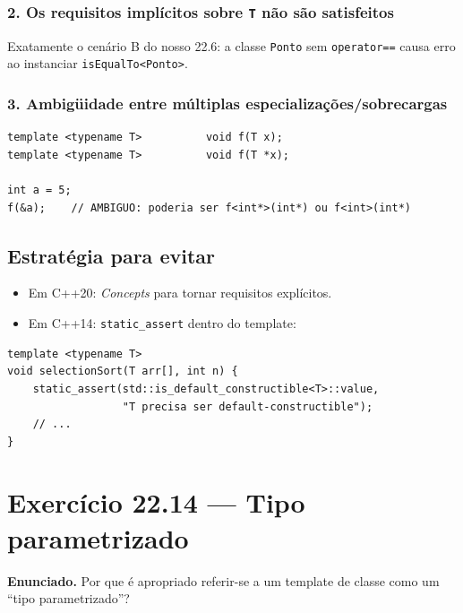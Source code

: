 \documentclass[11pt,a4paper]{article}
\begin{document}
\subsubsection*{2. Os requisitos impl\'icitos sobre \texttt{T} n\~ao s\~ao satisfeitos}

Exatamente o cen\'ario B do nosso 22.6: a classe \texttt{Ponto} sem \texttt{operator==} causa erro ao instanciar \texttt{isEqualTo<Ponto>}.

\subsubsection*{3. Ambig\"{u}idade entre m\'ultiplas especializa\c{c}\~oes/sobrecargas}

\begin{lstlisting}[style=cppcode,numbers=none]
template <typename T>          void f(T x);
template <typename T>          void f(T *x);

int a = 5;
f(&a);    // AMBIGUO: poderia ser f<int*>(int*) ou f<int>(int*)
\end{lstlisting}

\subsection*{Estrat\'egia para evitar}

\begin{itemize}[leftmargin=*,itemsep=0pt]
  \item Em C++20: \emph{Concepts} para tornar requisitos expl\'icitos.
  \item Em C++14: \texttt{static\_assert} dentro do template:
\end{itemize}

\begin{lstlisting}[style=cppcode,numbers=none]
template <typename T>
void selectionSort(T arr[], int n) {
    static_assert(std::is_default_constructible<T>::value,
                  "T precisa ser default-constructible");
    // ...
}
\end{lstlisting}

\section{Exerc\'icio 22.14 --- Tipo parametrizado}

\begin{enunciado}
\textbf{Enunciado.} Por que \'e apropriado referir-se a um template de classe como um ``tipo parametrizado''?
\end{enunciado}
\end{document}

